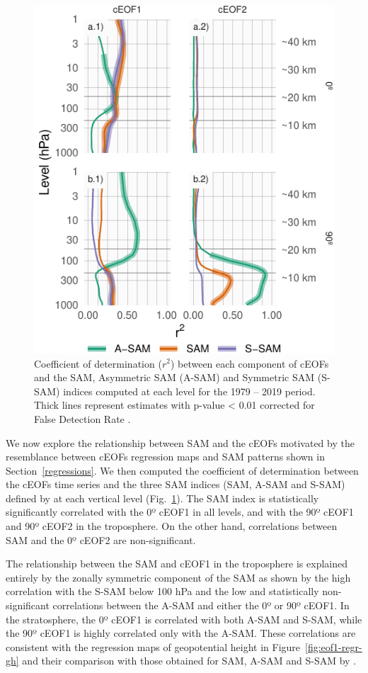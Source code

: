 \documentclass[pdflatex,sn-basic]{sn-jnl}
\theoremstyle{thmstyleone}%
\theoremstyle{thmstyletwo}%
\theoremstyle{thmstylethree}%
\begin{document}
\begin{figure}
\centering
\includegraphics{../figures/sam-eof-vertical-1.pdf}
\caption{\label{fig:sam-eof-vertical}Coefficient of determination (\(r^2\)) between each component of cEOFs and the SAM, Asymmetric SAM (A-SAM) and Symmetric SAM (S-SAM) indices computed at each level for the 1979 -- 2019 period. Thick lines represent estimates with p-value \textless{} 0.01 corrected for False Detection Rate \citep{benjamini1995}.}
\end{figure}

We now explore the relationship between SAM and the cEOFs motivated by the resemblance between cEOFs regression maps and SAM patterns shown in Section~\ref{regressions}.
We then computed the coefficient of determination between the cEOFs time series and the three SAM indices (SAM, A-SAM and S-SAM) defined by \citet{campitelli2022} at each vertical level (Fig.~\ref{fig:sam-eof-vertical}).
The SAM index is statistically significantly correlated with the 0º cEOF1 in all levels, and with the 90º cEOF1 and 90º cEOF2 in the troposphere.
On the other hand, correlations between SAM and the 0º cEOF2 are non-significant.

The relationship between the SAM and cEOF1 in the troposphere is explained entirely by the zonally symmetric component of the SAM as shown by the high correlation with the S-SAM below 100 hPa and the low and statistically non-significant correlations between the A-SAM and either the 0º or 90º cEOF1.
In the stratosphere, the 0º cEOF1 is correlated with both A-SAM and S-SAM, while the 90º cEOF1 is highly correlated only with the A-SAM.
These correlations are consistent with the regression maps of geopotential height in Figure~\ref{fig:eof1-regr-gh} and their comparison with those obtained for SAM, A-SAM and S-SAM by \citet{campitelli2022}.
\end{document}
